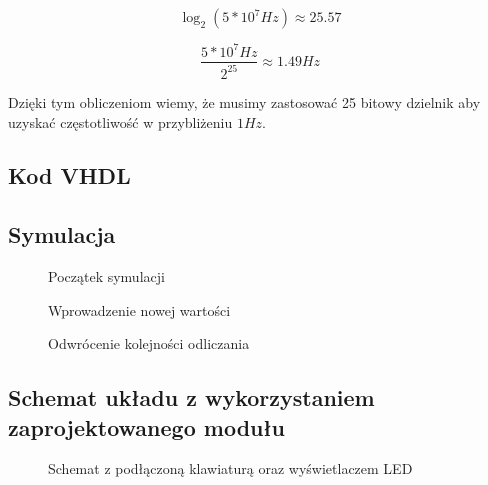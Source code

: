 \documentclass[a4paper,12pt]{extarticle}  %
\begin{document}
$$\log_2(5*10^7Hz)\approx25.57$$

$$\frac{5*10^7Hz}{2^25}\approx1.49Hz$$

Dzięki tym obliczeniom wiemy, że musimy zastosować 25 bitowy dzielnik aby uzyskać częstotliwość w przybliżeniu $1Hz$.
\subsection{Kod VHDL}

% 

\subsection{Symulacja}
\begin{figure}[H]
   \centering
   \caption{Początek symulacji}
\end{figure}
\begin{figure}[H]
	\centering
	\caption{Wprowadzenie nowej wartości}
 \end{figure}
 \begin{figure}[H]
	\centering
	\caption{Odwrócenie kolejności odliczania}
 \end{figure}
 \subsection{Schemat układu z wykorzystaniem zaprojektowanego modułu}
 \begin{figure}[H]
	 \centering
	 \caption{Schemat z podłączoną klawiaturą oraz wyświetlaczem LED}
  \end{figure}
\end{document}
